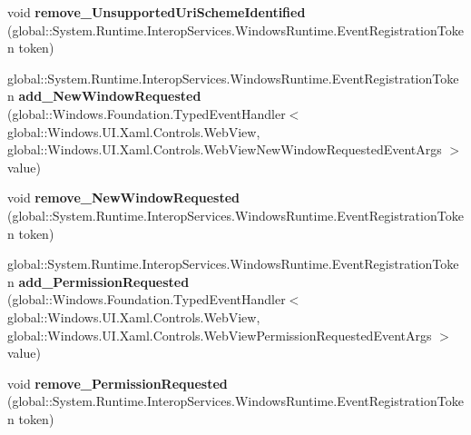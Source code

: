 \begin{DoxyCompactItemize}
\item 
\mbox{\label{interface_windows_1_1_u_i_1_1_xaml_1_1_controls_1_1_i_web_view4_a434db913b569c214fdd8ee1886fb3295}} 
void {\bfseries remove\+\_\+\+Unsupported\+Uri\+Scheme\+Identified} (global\+::\+System.\+Runtime.\+Interop\+Services.\+Windows\+Runtime.\+Event\+Registration\+Token token)
\item 
\mbox{\label{interface_windows_1_1_u_i_1_1_xaml_1_1_controls_1_1_i_web_view4_a31260436a1ad23171cfab6d9aa36d4d0}} 
global\+::\+System.\+Runtime.\+Interop\+Services.\+Windows\+Runtime.\+Event\+Registration\+Token {\bfseries add\+\_\+\+New\+Window\+Requested} (global\+::\+Windows.\+Foundation.\+Typed\+Event\+Handler$<$ global\+::\+Windows.\+U\+I.\+Xaml.\+Controls.\+Web\+View, global\+::\+Windows.\+U\+I.\+Xaml.\+Controls.\+Web\+View\+New\+Window\+Requested\+Event\+Args $>$ value)
\item 
\mbox{\label{interface_windows_1_1_u_i_1_1_xaml_1_1_controls_1_1_i_web_view4_a06f4976e0ae89feefa9ca60a799e7301}} 
void {\bfseries remove\+\_\+\+New\+Window\+Requested} (global\+::\+System.\+Runtime.\+Interop\+Services.\+Windows\+Runtime.\+Event\+Registration\+Token token)
\item 
\mbox{\label{interface_windows_1_1_u_i_1_1_xaml_1_1_controls_1_1_i_web_view4_adc0957ca3dc33612444167bf57005531}} 
global\+::\+System.\+Runtime.\+Interop\+Services.\+Windows\+Runtime.\+Event\+Registration\+Token {\bfseries add\+\_\+\+Permission\+Requested} (global\+::\+Windows.\+Foundation.\+Typed\+Event\+Handler$<$ global\+::\+Windows.\+U\+I.\+Xaml.\+Controls.\+Web\+View, global\+::\+Windows.\+U\+I.\+Xaml.\+Controls.\+Web\+View\+Permission\+Requested\+Event\+Args $>$ value)
\item 
\mbox{\label{interface_windows_1_1_u_i_1_1_xaml_1_1_controls_1_1_i_web_view4_a991ecf7ea74a7ba6b4e0df9150bd903e}} 
void {\bfseries remove\+\_\+\+Permission\+Requested} (global\+::\+System.\+Runtime.\+Interop\+Services.\+Windows\+Runtime.\+Event\+Registration\+Token token)
\item 

\end{DoxyCompactItemize}
